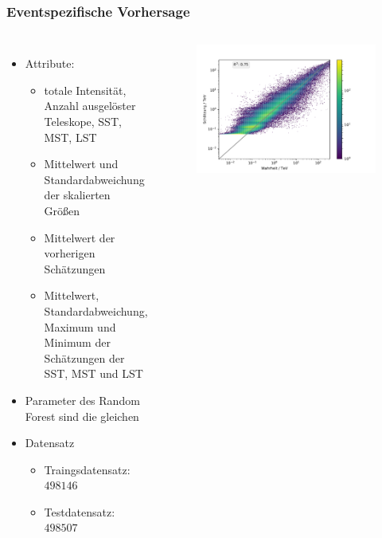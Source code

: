 \documentclass[aspectratio=1610, professionalfonts, 9pt]{beamer}
\begin{document}
  \begin{frame}
    \frametitle{Eventspezifische Vorhersage}
    \begin{columns}
      \begin{itemize}
        \item Attribute:
        \begin{itemize}
          \item totale Intensität, Anzahl ausgelöster Teleskope, SST, MST, LST
          \item Mittelwert und Standardabweichung der skalierten Größen
          \item Mittelwert der vorherigen Schätzungen
          \item Mittelwert, Standardabweichung, Maximum und Minimum der Schätzungen der SST, MST und LST
        \end{itemize}
        \item Parameter des Random Forest sind die gleichen
        \item Datensatz
        \begin{itemize}
          \item Traingsdatensatz: $\num{498146}$
          \item Testdatensatz: $\num{498507}$
        \end{itemize}
      \end{itemize}
      \begin{figure}
        \includegraphics[width=1.1\textwidth]{pictures/RF_encaps.pdf}
        \caption{}
        \label{}
      \end{figure}
    \end{columns}
  \end{frame}
\end{document}
